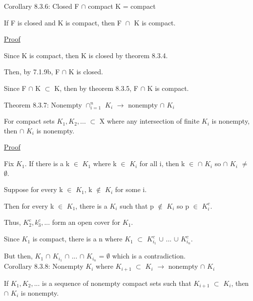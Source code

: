 { \color{orange} Corollary 8.3.6: Closed F $\cap$ compact K = compact } 

	\begin{adjustbox}{minipage=14cm, right, vspace=0.1cm 0cm}
		If F is closed and K is compact, then F $\cap_{}^{}$ K is compact.
	\end{adjustbox}

{ \color{magenta} \underline{Proof} } 

	Since K is compact, then K is closed by {\color{red} theorem 8.3.4}.

	Then, by {\color{red} 7.1.9b}, F $\cap$ K is closed.

	Since F $\cap$ K $\subset$ K, then by {\color{red} theorem 8.3.5},
	F $\cap$ K is compact. \\

\newpage

{ \color{red} Theorem 8.3.7: Nonempty $\cap_{i=1}^n$ $K_i$ $\rightarrow$
nonempty $\cap$ $K_i$ } 

	\begin{adjustbox}{minipage=14cm, right, vspace=0.1cm 0cm}
		For compact sets $K_1, K_2, ...$ $\subset$ X where any intersection
		of finite $K_i$ is nonempty, then $\cap$ $K_i$ is nonempty.
	\end{adjustbox}

{ \color{magenta} \underline{Proof} } 

	Fix $K_1$.
	If there is a k $\in$ $K_1$ where k $\in$ $K_i$ for all i, then
	k $\in$ $\cap$ $K_i$ so $\cap$ $K_i$ $\not =$ $\emptyset$.

	Suppose for every k $\in$ $K_1$, k $\not \in$ $K_i$ for some i.

	Then for every k $\in$ $K_1$, there is a $K_i$ such that
	p $\not \in$ $K_i$ so p $\in$ $K_i^c$.

	Thus, $K_2^c, k_3^c, ...$ form an open cover for $K_1$.

	Since $K_1$ is compact, there is a n where
	$K_1$ $\subset$ $K_{i_1}^c$ $\cup$ ... $\cup$ $K_{i_n}^c$.

	But then, $K_1$ $\cap$ $K_{i_1}$ $\cap$ ... $\cap$ $K_{i_n}$
	= $\emptyset$ which is a contradiction. \\

{ \color{orange} Corollary 8.3.8: Nonempty $K_i$ where $K_{i+1}$ $\subset$ $K_i$
$\rightarrow$ nonempty $\cap$ $K_i$}

	\begin{adjustbox}{minipage=14cm, right, vspace=0.1cm 0cm}
		If $K_1, K_2, ...$ is a sequence of nonempty compact sets
		such that $K_{i+1}$ $\subset$ $K_i$, then $\cap$ $K_i$ is nonempty.
	\end{adjustbox}


